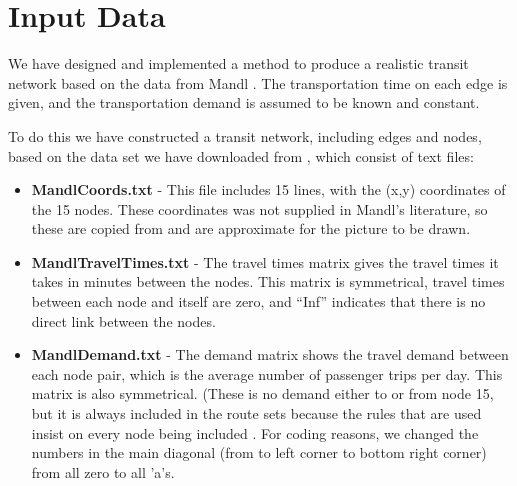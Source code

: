 \section{Input Data}


We have designed and implemented a method to produce a realistic transit network based on the data from Mandl \citep{mandl79}. The transportation time on each edge is given, and the transportation demand is assumed to be known and constant. 

To do this we have constructed a transit network, including edges and nodes, based on the data set we have downloaded from \citet{fan09}, which consist of text files:

\begin{itemize}
\item \textbf{MandlCoords.txt} - This file includes 15 lines, with the (x,y) coordinates of the 15 nodes. These coordinates was not supplied in Mandl's literature, so these are copied from \citet{fan09} and are approximate for the picture to be drawn.

\begingroup
\obeyspaces\obeylines
%
\endgroup%

\item \textbf{MandlTravelTimes.txt} - The travel times matrix gives the travel times it takes in minutes between the nodes. This matrix is symmetrical, travel times between each node and itself are zero, and ``Inf'' indicates that there is no direct link between the nodes. 

\begingroup
\obeyspaces\obeylines
%
\endgroup%

\item \textbf{MandlDemand.txt} - The demand matrix shows the travel demand between each node pair, which is the average number of passenger trips per day. This matrix is also symmetrical. (These is no demand either to or from node 15, but it is always included in the route sets because the rules that are used insist on every node being included \citep{fan09}. For coding reasons, we changed the numbers in the main diagonal (from to left corner to bottom right corner) from all zero to all ’a’s. 

\begingroup
\obeyspaces\obeylines
%
\endgroup%

\end{itemize}

